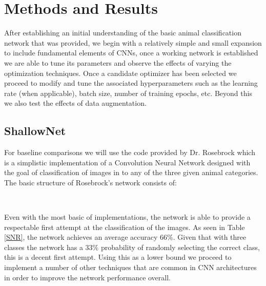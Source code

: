 \documentclass[12pt]{article}
\begin{document}
\section{Methods and Results}
After establishing an initial understanding of the basic  animal classification network that was provided, we begin with a relatively simple and small expansion to include fundamental elements of CNNs, once a working network is established we are able to tune its parameters and observe the effects of varying the optimization techniques. Once a candidate optimizer has been selected we proceed to modify and tune the associated hyperparameters such as the learning rate (when applicable), batch size, number of training epochs, etc. Beyond this we also test the effects of data augmentation. 

\subsection{ShallowNet}
For baseline comparisons we will use the code provided by Dr. Rosebrock \cite{rosebrock} which is a simplistic implementation of a Convolution Neural Network designed with the goal of classification of images in to any of the three given animal categories. The basic structure of Rosebrock's network consists of:
\begin{center}
	 \\
\end{center}
Even with the most basic of implementations, the network is able to provide a respectable first attempt at the classification of the images. As seen in Table \ref{SNR}, the network achieves an average accuracy $66\%$. Given that with three classes the network has a $33\%$ probability of randomly selecting the correct class, this is a decent first attempt. Using this as a lower bound we proceed to implement a number of other techniques that are common in CNN architectures in order to improve the network performance overall. 
\end{document}
